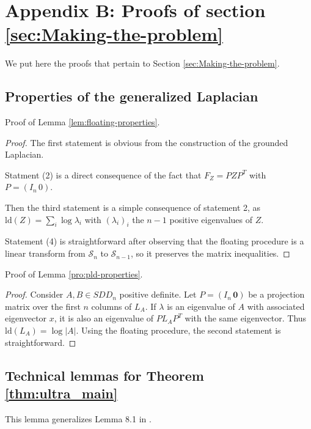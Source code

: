 
\section*{Appendix B: Proofs of section \ref{sec:Making-the-problem}}

We put here the proofs that pertain to Section \ref{sec:Making-the-problem}. 


\subsection{Properties of the generalized Laplacian}

Proof of Lemma \ref{lem:floating-properties}.

\begin{proof}The first statement is obvious from the construction
of the grounded Laplacian.

Statment (2) is a direct consequence of the fact that $F_{Z}=PZP^{T}$
with $P=\left(I_{n}\,0\right)$.

Then the third statement is a simple consequence of statement 2, as
$\text{ld}\left(Z\right)=\sum_{i}\log\lambda_{i}$ with $\left(\lambda_{i}\right)_{i}$
the $n-1$ positive eigenvalues of $Z$.

Statement (4) is straightforward after observing that the floating
procedure is a linear transform from $\mathcal{S}_{n}$ to $\mathcal{S}_{n-1}$,
so it preserves the matrix inequalities.

\end{proof}

Proof of Lemma \ref{pro:pld-properties}.

\begin{proof} Consider $A,B\in SDD_{n}$ positive definite. Let $P=\left(I_{n}\,\mathbf{0}\right)$
be a projection matrix over the first $n$ columns of $L_{A}$. If
$\lambda$ is an eigenvalue of $A$ with associated eigenvector $x$,
it is also an eigenvalue of $PL_{A}P^{T}$ with the same eigenvector.
Thus $\text{ld}\left(L_{A}\right)=\log\left|A\right|$. Using the
floating procedure, the second statement is straightforward.

\end{proof}


\subsection{Technical lemmas for Theorem \ref{thm:ultra_main}}

This lemma generalizes Lemma 8.1 in \cite{Spielman2009a}.

